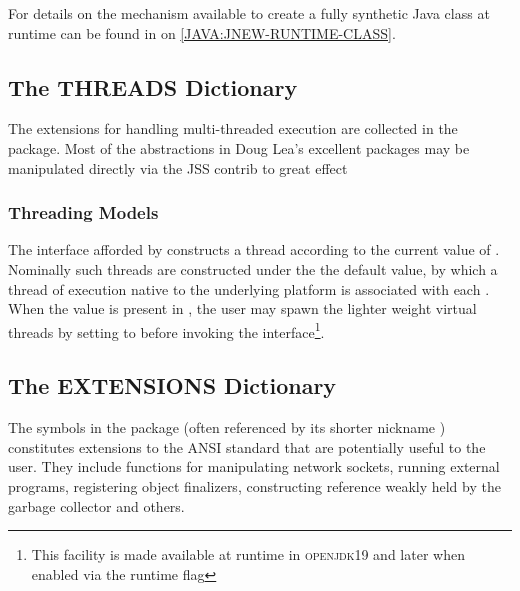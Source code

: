 \documentclass[10pt]{book}
\begin{document}
For details on the mechanism available to create a fully synthetic
Java class at runtime can be found in 
on \ref{JAVA:JNEW-RUNTIME-CLASS}.



\subsection{The THREADS Dictionary}

The extensions for handling multi-threaded execution are collected in
the  package.  Most of the abstractions in Doug Lea's
excellent  packages may be manipulated
directly via the JSS contrib to great effect \cite{lea-1998}

\subsubsection{Threading Models}
 The interface afforded by
 constructs a thread according to the
current value of .  Nominally such
threads are constructed under the the default  value, by
which a thread of execution native to the underlying platform is
associated with each .  When the value
 is present in , the user
may spawn the lighter weight virtual threads by setting
 to  before invoking
the  interface\footnote{This facility is
made available at runtime in \textsc{openjdk19} and later when enabled
via the runtime  flag}.  



\subsection{The EXTENSIONS Dictionary}

The symbols in the  package (often referenced by its
shorter nickname ) constitutes extensions to the
\textsc{ANSI} standard that are potentially useful to the user.  They
include functions for manipulating network sockets, running external
programs, registering object finalizers, constructing reference weakly
held by the garbage collector and others.
\end{document}
